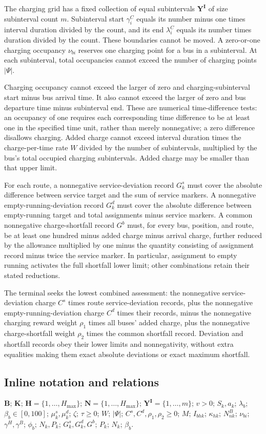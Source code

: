 \documentclass[10pt]{article}
\begin{document}
The charging grid has a fixed collection of equal subintervals $\mathbf Y^{\mathbf I}$ of size subinterval count $m$. Subinterval start $\gamma_i^C$ equals its number minus one times interval duration divided by the count, and its end $\lambda_i^C$ equals its number times duration divided by the count. These boundaries cannot be moved. A zero-or-one charging occupancy $\nu_{bi}$ reserves one charging point for a bus in a subinterval. At each subinterval, total occupancies cannot exceed the number of charging points $|\Psi|$.

Charging occupancy cannot exceed the larger of zero and charging-subinterval start minus bus arrival time. It also cannot exceed the larger of zero and bus departure time minus subinterval end. These are numerical time-difference tests: an occupancy of one requires each corresponding time difference to be at least one in the specified time unit, rather than merely nonnegative; a zero difference disallows charging. Added charge cannot exceed interval duration times the charge-per-time rate $W$ divided by the number of subintervals, multiplied by the bus's total occupied charging subintervals. Added charge may be smaller than that upper limit.

For each route, a nonnegative service-deviation record $G_k^s$ must cover the absolute difference between service target and the sum of service markers. A nonnegative empty-running-deviation record $G_k^d$ must cover the absolute difference between empty-running target and total assignments minus service markers. A common nonnegative charge-shortfall record $G^b$ must, for every bus, position, and route, be at least one hundred minus added charge minus arrival charge, further reduced by the allowance multiplied by one minus the quantity consisting of assignment record minus twice the service marker. In particular, assignment to empty running activates the full shortfall lower limit; other combinations retain their stated reductions.

The terminal seeks the lowest combined assessment: the nonnegative service-deviation charge $C^s$ times route service-deviation records, plus the nonnegative empty-running-deviation charge $C^d$ times their records, minus the nonnegative charging reward weight $\rho_1$ times all buses' added charge, plus the nonnegative charge-shortfall weight $\rho_2$ times the common shortfall record. Deviation and shortfall records obey their lower limits and nonnegativity, without extra equalities making them exact absolute deviations or exact maximum shortfall.

\subsection*{Inline notation and relations}
$\mathbf B$; $\mathbf K$; $\mathbf H=\{1,\ldots,H_{\max}\}$; $\mathbf N=\{1,\ldots,H_{\max}\}$; $\mathbf Y^{\mathbf I}=\{1,\ldots,m\}$; $v>0$; $S_k,a_k$; $\lambda_b$; $\beta_b\in[0,100]$; $\mu_k^s,\mu_k^d$; $\zeta$; $\tau\ge0$; $W$; $|\Psi|$; $C^s,C^d,\rho_1,\rho_2\ge0$; $M$; $I_{bhk}$; $\kappa_{hk}$; $N^B_{nk}$; $\nu_{bi}$; $\gamma^H,\gamma^B$; $\phi_b$; $N_k,P_k$; $G_k^s,G_k^d,G^b$; $P_k$; $N_k$; $\beta_b$.
\end{document}
